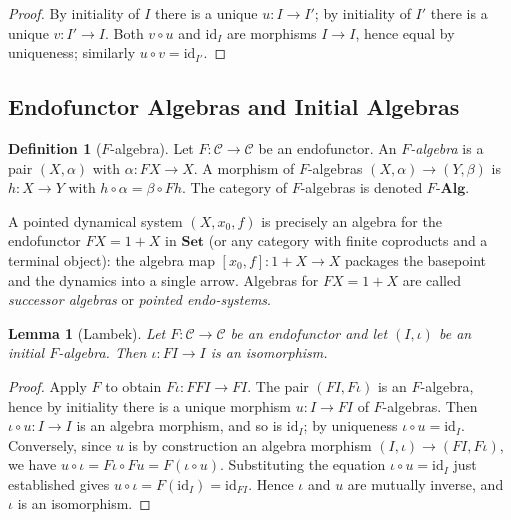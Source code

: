 \documentclass[12pt]{article}
\newtheorem{lemma}[theorem]{Lemma}
\theoremstyle{definition}
\newtheorem{definition}[theorem]{Definition}
\theoremstyle{remark}
\newcommand{\Set}{\mathbf{Set}}
\newcommand{\id}{\mathrm{id}}
\begin{document}
\begin{proof}
By initiality of $I$ there is a unique $u \colon I \to I'$; by initiality of $I'$ there is a unique $v \colon I' \to I$. Both $v \circ u$ and $\id_I$ are morphisms $I \to I$, hence equal by uniqueness; similarly $u \circ v = \id_{I'}$.
\end{proof}

\subsection{Endofunctor Algebras and Initial Algebras}

\begin{definition}[$F$-algebra]
Let $F \colon \mathcal{C} \to \mathcal{C}$ be an endofunctor. An \emph{$F$-algebra} is a pair $(X, \alpha)$ with $\alpha \colon F X \to X$. A morphism of $F$-algebras $(X, \alpha) \to (Y, \beta)$ is $h \colon X \to Y$ with $h \circ \alpha = \beta \circ Fh$. The category of $F$-algebras is denoted $F\text{-}\mathbf{Alg}$.
\end{definition}

A pointed dynamical system $(X, x_0, f)$ is precisely an algebra for the endofunctor $F X = 1 + X$ in $\Set$ (or any category with finite coproducts and a terminal object): the algebra map $[x_0, f] \colon 1 + X \to X$ packages the basepoint and the dynamics into a single arrow. Algebras for $F X = 1 + X$ are called \emph{successor algebras} or \emph{pointed endo-systems}.

\begin{lemma}[Lambek]
\label{lem:lambek}
Let $F \colon \mathcal{C} \to \mathcal{C}$ be an endofunctor and let $(I, \iota)$ be an initial $F$-algebra. Then $\iota \colon F I \to I$ is an isomorphism.
\end{lemma}

\begin{proof}
Apply $F$ to obtain $F\iota \colon F F I \to F I$. The pair $(F I, F \iota)$ is an $F$-algebra, hence by initiality there is a unique morphism $u \colon I \to F I$ of $F$-algebras. Then $\iota \circ u \colon I \to I$ is an algebra morphism, and so is $\id_I$; by uniqueness $\iota \circ u = \id_I$. Conversely, since $u$ is by construction an algebra morphism $(I, \iota) \to (F I, F\iota)$, we have $u \circ \iota = F\iota \circ Fu = F(\iota \circ u)$. Substituting the equation $\iota \circ u = \id_I$ just established gives $u \circ \iota = F(\id_I) = \id_{F I}$. Hence $\iota$ and $u$ are mutually inverse, and $\iota$ is an isomorphism.
\end{proof}
\end{document}
